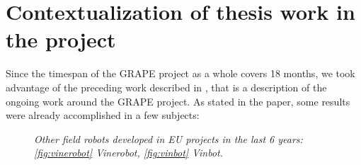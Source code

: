 \section{Contextualization of thesis work in the project} \label{sec:thesisInGrape}

 Since the timespan of the \ac{GRAPE} project as a whole covers 18 months, we took advantage of the preceding work described in \cite{grapeAltroPaper}, that is a description of the ongoing work around the \ac{GRAPE} project. As stated in the paper, some results were already accomplished in a few subjects:

\begin{figure}
	\centering
	\qquad
	\caption{\textit{Other field robots developed in EU projects in the last 6 years: \ref{fig:vinerobot} Vinerobot, \ref{fig:vinbot} Vinbot.}}
\end{figure}

